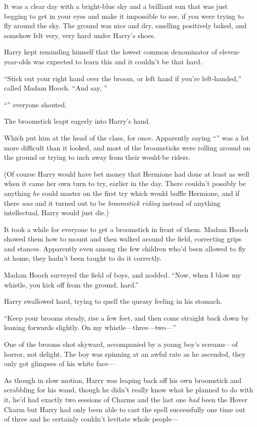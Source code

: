 It was a clear day with a bright-blue sky and a brilliant sun that was just begging to get in your eyes and make it impossible to see, if you were trying to fly around the sky. The ground was nice and dry, smelling positively baked, and somehow felt very, very hard under Harry’s shoes.

Harry kept reminding himself that the lowest common denominator of eleven-year-olds was expected to learn this and it couldn’t be that hard.

“Stick out your right hand over the broom, or left hand if you’re left-handed,” called Madam Hooch. “And say, ”

“” everyone shouted.

The broomstick leapt eagerly into Harry’s hand.

Which put him at the head of the class, for once. Apparently saying “” was a lot more difficult than it looked, and most of the broomsticks were rolling around on the ground or trying to inch away from their would-be riders.

(Of course Harry would have bet money that Hermione had done at least as well when it came her own turn to try, earlier in the day. There couldn’t possibly be anything \emph{he} could master on the first try which would baffle Hermione, and if there \emph{was} and it turned out to be \emph{broomstick riding} instead of anything intellectual, Harry would just die.)

It took a while for everyone to get a broomstick in front of them. Madam Hooch showed them how to mount and then walked around the field, correcting grips and stances. Apparently even among the few children who’d been allowed to fly at home, they hadn’t been taught to do it correctly.

Madam Hooch surveyed the field of boys, and nodded. “Now, when I blow my whistle, you kick off from the ground, hard.”

Harry swallowed hard, trying to quell the queasy feeling in his stomach.

“Keep your brooms steady, rise a few feet, and then come straight back down by leaning forwards slightly. On my whistle—three—two—”

One of the brooms shot skyward, accompanied by a young boy’s screams—of horror, not delight. The boy was spinning at an awful rate as he ascended, they only got glimpses of his white face—

As though in slow motion, Harry was leaping back off his own broomstick and scrabbling for his wand, though he didn’t really know what he planned to do with it, he’d had exactly two sessions of Charms and the last one \emph{had} been the Hover Charm but Harry had only been able to cast the spell successfully one time out of three and he certainly couldn’t levitate whole people—

